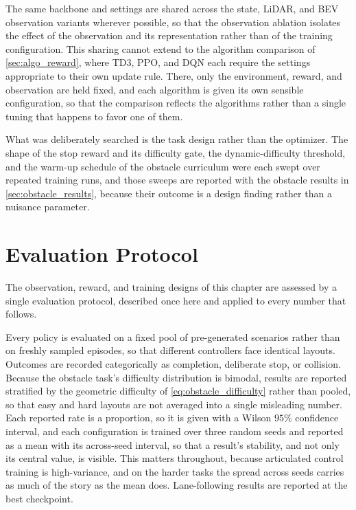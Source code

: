 The same backbone and settings are shared across the state, LiDAR, and BEV observation variants wherever possible, so that the observation ablation isolates the effect of the observation and its representation rather than of the training configuration. This sharing cannot extend to the algorithm comparison of \cref{sec:algo_reward}, where TD3, PPO, and DQN each require the settings appropriate to their own update rule. There, only the environment, reward, and observation are held fixed, and each algorithm is given its own sensible configuration, so that the comparison reflects the algorithms rather than a single tuning that happens to favor one of them.

What was deliberately searched is the task design rather than the optimizer. The shape of the stop reward and its difficulty gate, the dynamic-difficulty threshold, and the warm-up schedule of the obstacle curriculum were each swept over repeated training runs, and those sweeps are reported with the obstacle results in \cref{sec:obstacle_results}, because their outcome is a design finding rather than a nuisance parameter.

\section{Evaluation Protocol}
\label{sec:eval_methodology}
\label{sec:eval_setup}

The observation, reward, and training designs of this chapter are assessed by a single evaluation protocol, described once here and applied to every number that follows.

Every policy is evaluated on a fixed pool of pre-generated scenarios rather than on freshly sampled episodes, so that different controllers face identical layouts. Outcomes are recorded categorically as completion, deliberate stop, or collision. Because the obstacle task's difficulty distribution is bimodal, results are reported stratified by the geometric difficulty of \cref{eq:obstacle_difficulty} rather than pooled, so that easy and hard layouts are not averaged into a single misleading number. Each reported rate is a proportion, so it is given with a Wilson $95\%$ confidence interval, and each configuration is trained over three random seeds and reported as a mean with its across-seed interval, so that a result's stability, and not only its central value, is visible. This matters throughout, because articulated control training is high-variance, and on the harder tasks the spread across seeds carries as much of the story as the mean does. Lane-following results are reported at the best checkpoint.

